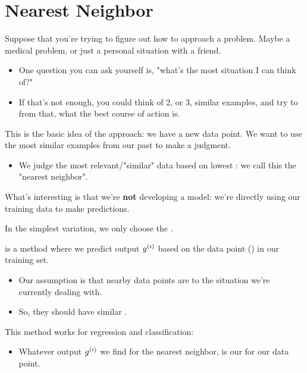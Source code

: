     \pagebreak




    

    





\section{Nearest Neighbor}

    Suppose that you're trying to figure out how to approach a problem. Maybe a medical problem, or just a personal situation with a friend.
    
    \begin{itemize}
        \item One question you can ask yourself is, "what's the most  situation I can think of?"
        \item If that's not enough, you could think of 2, or 3, similar examples, and try to  from that, what the best course of action is.
    \end{itemize}

    This is the basic idea of the  approach: we have a new data point. We want to use the most similar examples from our past  to make a judgment.

    \begin{itemize}
        \item We judge the most relevant/"similar" data based on lowest : we call this the "nearest neighbor".
    \end{itemize}

    What's interesting is that we're \textbf{not} developing a model: we're directly using our training data to make predictions.

    In the simplest variation, we only choose the .\\

    \begin{definition}
         is a  method where we predict output $g^{(i)}$ based on the  data point () in our training set.

        \begin{itemize}
            \item Our assumption is that nearby data points are  to the situation we're currently dealing with.
            \item So, they should have similar .
        \end{itemize}

        This method works  for regression and classification:

        \begin{itemize}
            \item Whatever output $g^{(i)}$ we find for the nearest neighbor, is our  for our data point.
        \end{itemize}
    \end{definition}

